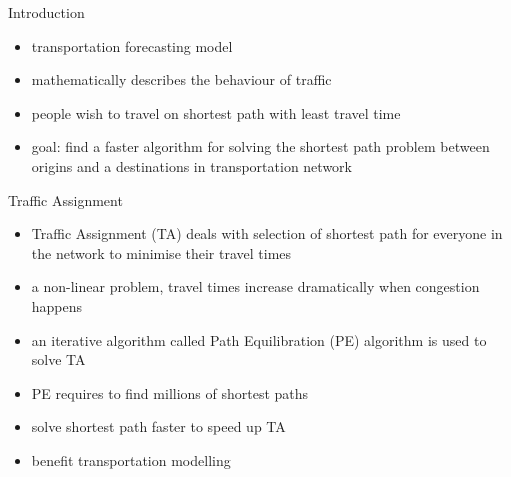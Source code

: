 \documentclass[final]{beamer}
\begin{document}
\begin{frame}{ }
    \begin{columns}[t]
        \begin{column}{.26\linewidth}

            \begin{block}{Introduction}
                \begin{itemize}
                    \itemsep.5em
                    \item transportation forecasting model
                    \item mathematically describes the behaviour of traffic
                    \item people wish to travel on shortest path with least travel time
                    \item \alert{goal}: find a \alert{faster} algorithm for solving the \alert{shortest path} problem between origins and a destinations in transportation network
                \end{itemize}
            \end{block}

            \hspace{25em}

            \begin{block}{Traffic Assignment}
                \begin{itemize}
                    \itemsep.5em
                    \item \alert{Traffic Assignment (TA)} deals with selection of \alert{shortest path} for everyone in the network to \alert{minimise} their \alert{travel times}
                    \item a \alert{non-linear} problem, travel times increase dramatically when \alert{congestion} happens
                    \item an \alert{iterative algorithm} called \alert{Path Equilibration (PE)} algorithm is used to solve TA
                    \item \alert{PE} requires to find \alert{millions} of \alert{shortest paths}
                    \item solve shortest path faster to speed up TA 
                    \item benefit transportation modelling
                \end{itemize}
            \end{block}

            \hspace{25em}


\end{column}
\end{columns}
\end{frame}
\end{document}
